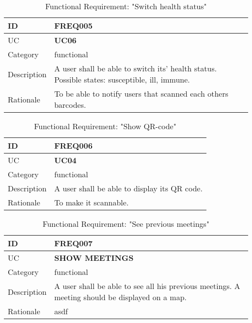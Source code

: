 \begin{flushleft}
\vspace{5mm}
\begin{table}[H]
	\begin{tabular}{ |p{2cm}||p{9cm}| }
		\hline
        ID & \textbf{FREQ005}\\ \hline
        UC & \textbf{UC06} \\ \hline
		Category & functional \\ \hline
		Description &
        A user shall be able to switch its' health status. 
        Possible states: susceptible, ill, immune.
		\\ \hline
		Rationale & To be able to notify users that scanned each others barcodes. \\ \hline
	\end{tabular}
	\caption{Functional Requirement: "Switch health status"}
\end{table}

\vspace{5mm}
\begin{table}[H]
	\begin{tabular}{ |p{2cm}||p{9cm}| }
		\hline
        ID & \textbf{FREQ006}\\ \hline
        UC & \textbf{UC04} \\ \hline
		Category & functional \\ \hline
		Description &
		A user shall be able to display its QR code. 
		\\ \hline
		Rationale & To make it scannable. \\ \hline
	\end{tabular}
	\caption{Functional Requirement: "Show QR-code"}
\end{table}


\vspace{5mm}
\begin{table}[H]
	\begin{tabular}{ |p{2cm}||p{9cm}| }
		\hline
        ID & \textbf{FREQ007}\\ \hline
        UC & \textbf{SHOW MEETINGS} \\ \hline
		Category & functional \\ \hline
		Description &
		A user shall be able to see all his previous meetings.
		A meeting should be displayed on a map.
		\\ \hline
		Rationale & asdf \\ \hline
	\end{tabular}
	\caption{Functional Requirement: "See previous meetings"}
\end{table}


\end{flushleft}

